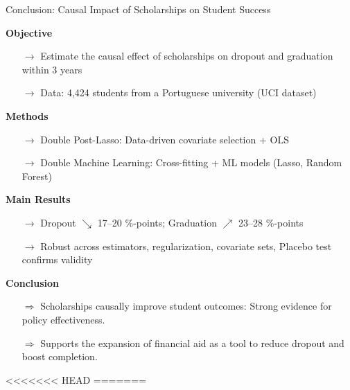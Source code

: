 \documentclass[aspectratio=169]{beamer}
\begin{document}
\begin{frame}{Conclusion: Causal Impact of Scholarships on Student Success}
	
	\textbf{Objective} 
	\vspace{-5pt}
	\begin{itemize}
	\item[$\rightarrow$]Estimate the causal effect of scholarships on dropout and graduation within 3 years 
	\item[$\rightarrow$]Data: 4,424 students from a Portuguese university (UCI dataset) 
	\end{itemize}
	\vspace{-5pt}
	
	\textbf{Methods}
	\vspace{-5pt}
	\begin{itemize}
	\item[$\rightarrow$]Double Post-Lasso: Data-driven covariate selection + OLS
	\item[$\rightarrow$]Double Machine Learning: Cross-fitting + ML models (Lasso, Random Forest)
	\end{itemize}
	\vspace{-5pt}
	
	\textbf{Main Results}
	\vspace{-5pt}
	\begin{itemize}
	\item[$\rightarrow$]Dropout $\searrow$ 17–20 \%-points; Graduation $\nearrow$ 23–28 \%-points
	\item[$\rightarrow$]Robust across estimators, regularization, covariate sets, Placebo test confirms validity
	\end{itemize}
	\vspace{-5pt}

	\textbf{Conclusion}
	\vspace{-5pt}
	\begin{itemize}
	\item[$\Rightarrow$]Scholarships causally improve student outcomes: Strong evidence for policy effectiveness.
	\item[$\Rightarrow$]Supports the expansion of financial aid as a tool to reduce dropout and boost completion.
	\end{itemize}
	
\end{frame}
<<<<<<< HEAD
=======

\appendix
\end{document}
